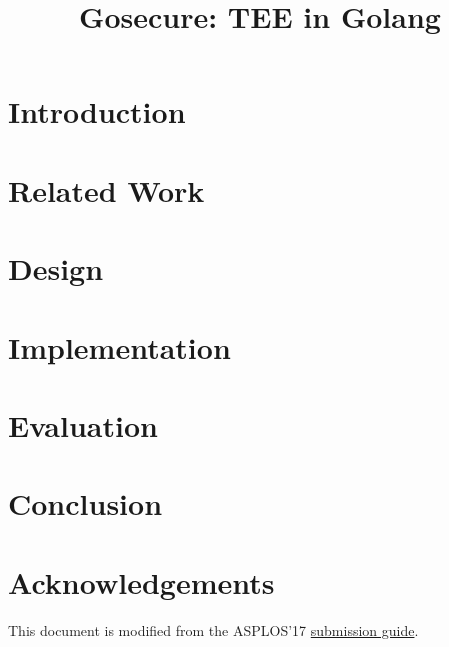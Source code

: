 \documentclass[pageno]{jpaper}
\begin{document}
\title{Gosecure: TEE in Golang}

\date{}
\maketitle

\thispagestyle{empty}

\begin{abstract}



\end{abstract}

\section{Introduction}



\section{Related Work}



\section{Design}



\section{Implementation}



\section{Evaluation}



\section{Conclusion}



\section{Acknowledgements}

This document is modified from the ASPLOS'17 \href{http://novel.ict.ac.cn/ASPLOS2017/files/asplos17-template.pdf}{submission guide}.



\end{document}
